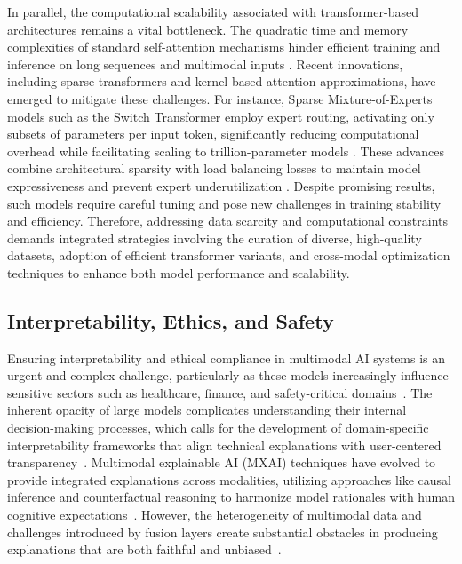 \documentclass[sigconf]{acmart}
\begin{document}
In parallel, the computational scalability associated with transformer-based architectures remains a vital bottleneck. The quadratic time and memory complexities of standard self-attention mechanisms hinder efficient training and inference on long sequences and multimodal inputs \cite{ref2,ref4,ref5,ref21,ref33}. Recent innovations, including sparse transformers and kernel-based attention approximations, have emerged to mitigate these challenges. For instance, Sparse Mixture-of-Experts models such as the Switch Transformer employ expert routing, activating only subsets of parameters per input token, significantly reducing computational overhead while facilitating scaling to trillion-parameter models \cite{ref14,ref33}. These advances combine architectural sparsity with load balancing losses to maintain model expressiveness and prevent expert underutilization \cite{ref14}. Despite promising results, such models require careful tuning and pose new challenges in training stability and efficiency. Therefore, addressing data scarcity and computational constraints demands integrated strategies involving the curation of diverse, high-quality datasets, adoption of efficient transformer variants, and cross-modal optimization techniques to enhance both model performance and scalability.

\subsection{Interpretability, Ethics, and Safety}

Ensuring interpretability and ethical compliance in multimodal AI systems is an urgent and complex challenge, particularly as these models increasingly influence sensitive sectors such as healthcare, finance, and safety-critical domains~\cite{ref11,ref12,ref13}. The inherent opacity of large models complicates understanding their internal decision-making processes, which calls for the development of domain-specific interpretability frameworks that align technical explanations with user-centered transparency~\cite{ref28,ref34}. Multimodal explainable AI (MXAI) techniques have evolved to provide integrated explanations across modalities, utilizing approaches like causal inference and counterfactual reasoning to harmonize model rationales with human cognitive expectations~\cite{ref11,ref13}. However, the heterogeneity of multimodal data and challenges introduced by fusion layers create substantial obstacles in producing explanations that are both faithful and unbiased~\cite{ref28}.
\end{document}
